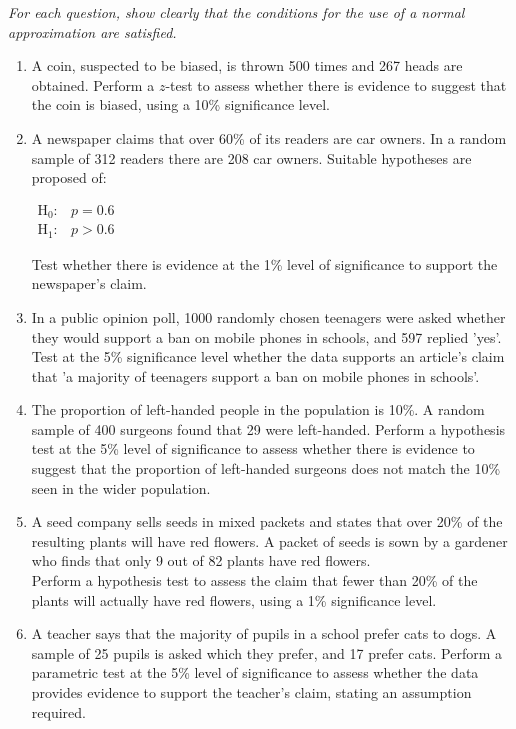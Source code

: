 \documentclass[
  11pt,
]{book}
\begin{document}
\emph{For each question, show clearly that the conditions for the use of a normal approximation are satisfied.}

\begin{enumerate}
    \item A coin, suspected to be biased, is thrown 500 times and 267 heads are obtained. Perform a $z$-test to assess whether there is evidence to suggest that the coin is biased, using a 10\% significance level.
    \item A newspaper claims that over 60\% of its readers are car owners. In a random sample of 312 readers there are 208 car owners. Suitable hypotheses are proposed of:
    \begin{center}
        \begin{math}
          \begin{array}{ll}
            \text{H}_\text{0}: & p=\text{0.6}\\
            \text{H}_\text{1}: & p>\text{0.6}
          \end{array}
      \end{math}
    \end{center}
    Test whether there is evidence at the 1\% level of significance to support the newspaper's claim.
    \item In a public opinion poll, 1000 randomly chosen teenagers were asked whether they would support a ban on mobile phones in schools, and 597 replied 'yes'. Test at the 5\% significance level whether the data supports an article's claim that 'a majority of teenagers support a ban on mobile phones in schools'.
    \item The proportion of left-handed people in the population is 10\%. A random sample of 400 surgeons found that 29 were left-handed. Perform a hypothesis test at the 5\% level of significance to assess whether there is evidence to suggest that the proportion of left-handed surgeons does not match the 10\% seen in the wider population.
    \item A seed company sells seeds in mixed packets and states that over 20\% of the resulting plants will have red flowers. A packet of seeds is sown by a gardener who finds that only 9 out of 82 plants have red flowers.\\[0.5em] Perform a hypothesis test to assess the claim that fewer than 20\% of the plants will actually have red flowers, using a 1\% significance level.
    \item A teacher says that the majority of pupils in a school prefer cats to dogs. A sample of 25 pupils is asked which they prefer, and 17 prefer cats. Perform a parametric test at the 5\% level of significance to assess whether the data provides evidence to support the teacher's claim, stating an assumption required.

\end{enumerate}
\end{document}
